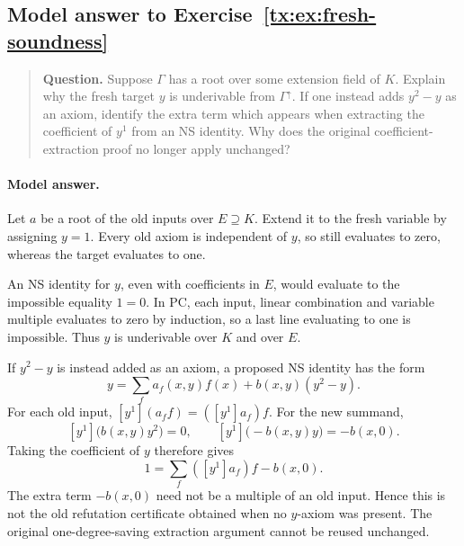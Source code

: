 \par


\begin{samepage}

\subsection*{Model answer to Exercise~\ref{tx:ex:fresh-soundness}}\label{tx:ans:fresh-soundness}

\begin{quote}\small\textbf{Question.} Suppose $\Gamma$ has a root over some extension field of $K$. Explain
why the fresh target $y$ is underivable from $\Gamma^\uparrow$.
If one instead adds $y^2-y$ as an axiom, identify the extra term which
appears when extracting the coefficient of $y^1$ from an NS identity.
Why does the original coefficient-extraction proof no longer apply
unchanged?
\end{quote}

\paragraph{Model answer.}
Let \(a\) be a root of the old inputs over \(E\supseteq K\).
Extend it to the fresh variable by assigning \(y=1\).
Every old axiom is independent of \(y\), so still evaluates to zero,
whereas the target evaluates to one.
\end{samepage}

An NS identity for \(y\), even with coefficients in \(E\), would
evaluate to the impossible equality \(1=0\). In PC, each input,
linear combination and variable multiple evaluates to zero by
induction, so a last line evaluating to one is impossible.
Thus \(y\) is underivable over \(K\) and over \(E\).

If \(y^2-y\) is instead added as an axiom, a proposed NS identity has
the form
\[
                 y=\sum_f a_f(x,y)f(x)+b(x,y)(y^2-y).
\]
For each old input,
\([y^1](a_f f)=([y^1]a_f)f\). For the new summand,
\[
 [y^1]\bigl(b(x,y)y^2\bigr)=0,\qquad
 [y^1]\bigl(-b(x,y)y\bigr)=-b(x,0).
\]
Taking the coefficient of \(y\) therefore gives
\[
                       1=\sum_f([y^1]a_f)f-b(x,0).
\]
The extra term \(-b(x,0)\) need not be a multiple of an old input.
Hence this is not the old refutation certificate obtained when no
\(y\)-axiom was present. The original one-degree-saving extraction
argument cannot be reused unchanged.


